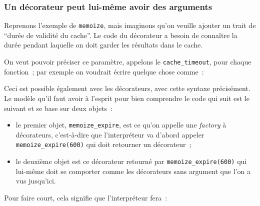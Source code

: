     \hypertarget{un-duxe9corateur-peut-lui-muxeame-avoir-des-arguments}{%
\subsubsection{Un décorateur peut lui-même avoir des
arguments}\label{un-duxe9corateur-peut-lui-muxeame-avoir-des-arguments}}

    Reprenons l'exemple de \texttt{memoize}, mais imaginons qu'on veuille
ajouter un trait de ``durée de validité du cache''. Le code du
décorateur a besoin de connaître la durée pendant laquelle on doit
garder les résultats dans le cache.

On veut pouvoir préciser ce paramètre, appelons le
\texttt{cache\_timeout}, pour chaque fonction~; par exemple on voudrait
écrire quelque chose comme~:

\begin{Shaded}
\begin{Highlighting}[frame=lines,framerule=0.6mm,rulecolor=\color{asisframecolor}]
\NormalTok{(}\NormalTok{)}

\NormalTok{(}\OperatorTok{*}\NormalTok{)}
\end{Highlighting}
\end{Shaded}

    Ceci est possible également avec les décorateurs, avec cette syntaxe
précisément. Le modèle qu'il faut avoir à l'esprit pour bien comprendre
le code qui suit est le suivant et se base sur deux objets~:

\begin{itemize}
\tightlist
\item
  le premier objet, \texttt{memoize\_expire}, est ce qu'on appelle une
  \emph{factory} à décorateurs, c'est-à-dire que l'interpréteur va
  d'abord appeler \texttt{memoize\_expire(600)} qui doit retourner un
  décorateur~;
\item
  le deuxième objet est ce décorateur retourné par
  \texttt{memoize\_expire(600)} qui lui-même doit se comporter comme les
  décorateurs sans argument que l'on a vus jusqu'ici.
\end{itemize}

Pour faire court, cela signifie que l'interpréteur fera~:

\begin{Shaded}
\begin{Highlighting}[frame=lines,framerule=0.6mm,rulecolor=\color{asisframecolor}]
\OperatorTok{=}
\end{Highlighting}
\end{Shaded}

